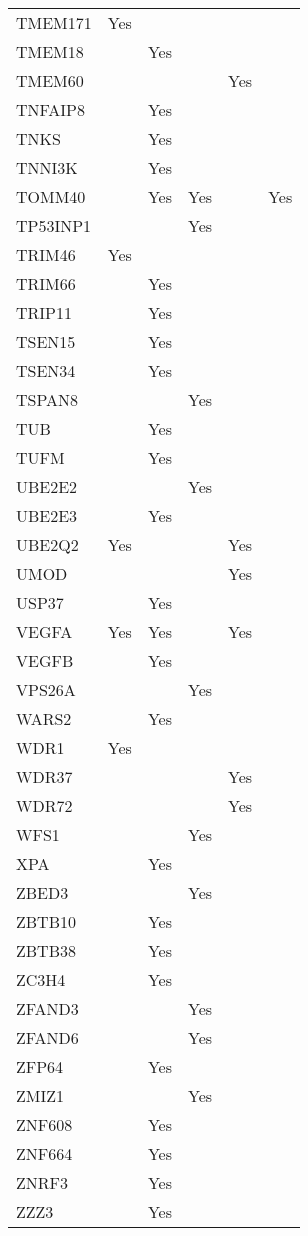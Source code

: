 \documentclass[twoside,openright]{report}
\begin{document}
\begin{appendices}
\begin{longtable}[t]{llllll}
TMEM171 & Yes &  &  &  & \\
TMEM18 &  & Yes &  &  & \\
TMEM60 &  &  &  & Yes & \\
TNFAIP8 &  & Yes &  &  & \\
TNKS &  & Yes &  &  & \\
TNNI3K &  & Yes &  &  & \\
TOMM40 &  & Yes & Yes &  & Yes\\
TP53INP1 &  &  & Yes &  & \\
TRIM46 & Yes &  &  &  & \\
TRIM66 &  & Yes &  &  & \\
TRIP11 &  & Yes &  &  & \\
TSEN15 &  & Yes &  &  & \\
TSEN34 &  & Yes &  &  & \\
TSPAN8 &  &  & Yes &  & \\
TUB &  & Yes &  &  & \\
TUFM &  & Yes &  &  & \\
UBE2E2 &  &  & Yes &  & \\
UBE2E3 &  & Yes &  &  & \\
UBE2Q2 & Yes &  &  & Yes & \\
UMOD &  &  &  & Yes & \\
USP37 &  & Yes &  &  & \\
VEGFA & Yes & Yes &  & Yes & \\
VEGFB &  & Yes &  &  & \\
VPS26A &  &  & Yes &  & \\
WARS2 &  & Yes &  &  & \\
WDR1 & Yes &  &  &  & \\
WDR37 &  &  &  & Yes & \\
WDR72 &  &  &  & Yes & \\
WFS1 &  &  & Yes &  & \\
XPA &  & Yes &  &  & \\
ZBED3 &  &  & Yes &  & \\
ZBTB10 &  & Yes &  &  & \\
ZBTB38 &  & Yes &  &  & \\
ZC3H4 &  & Yes &  &  & \\
ZFAND3 &  &  & Yes &  & \\
ZFAND6 &  &  & Yes &  & \\
ZFP64 &  & Yes &  &  & \\
ZMIZ1 &  &  & Yes &  & \\
ZNF608 &  & Yes &  &  & \\
ZNF664 &  & Yes &  &  & \\
ZNRF3 &  & Yes &  &  & \\
ZZZ3 &  & Yes &  &  & \\*
\end{longtable}


\end{appendices}
\end{document}
